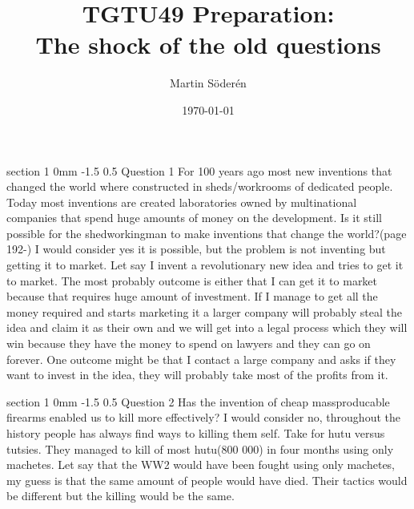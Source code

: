 \documentclass[a4paper,11pt]{article}
\makeatletter
\renewcommand{\section}{\@startsection
   {section}%
   {1}%
   {0mm}%
   {-1.5\baselineskip}%
   {0.5\baselineskip}%
   {\sffamily\bfseries\upshape\normalsize}}%
\makeatother
\begin{document}
\begin{titlepage}
\title{TGTU49 Preparation:\\
The shock of the old questions}
\author{Martin Söderén}
\date{\today}
\maketitle



\vfill %

\thispagestyle{empty}

\end{titlepage}

\section{Question 1}
For 100 years ago most new inventions that changed the world where constructed in sheds/workrooms of dedicated people. Today most inventions are created laboratories owned by multinational companies that spend huge amounts of money on the development. Is it still possible for the shedworkingman to make inventions that change the world?(page 192-)
\newline
\newline
I would consider yes it is possible, but the problem is not inventing but getting it to market. Let say I invent a revolutionary new idea and tries to get it to market. The most probably outcome is either that I can get it to market because that requires huge amount of investment. If I manage to get all the money required and starts marketing it a larger company will probably steal the idea and claim it as their own and we will get into a legal process which they will win because they have the money to spend on lawyers and they can go on forever.
One outcome might be that I contact a large company and asks if they want to invest in the idea, they will probably take most of the profits from it. 

\section{Question 2}
Has the invention of cheap massproducable firearms enabled us to kill more effectively?\newline
\newline
I would consider no, throughout the history people has always find ways to killing them self. Take for hutu versus tutsies. They managed to kill of most hutu(800 000) in four months using only machetes. Let say that the WW2 would have been fought using only machetes, my guess is that the same amount of people would have died. Their tactics would be different but the killing would be the same. 
\end{document}
